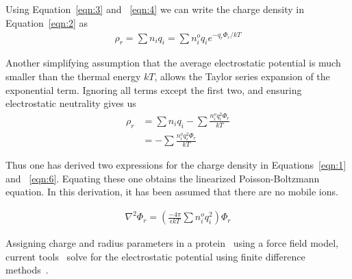 Using Equation~\ref{eqn:3} and ~\ref{eqn:4} we can write the charge density in Equation~\ref{eqn:2} as
\begin{align}
\label{eqn:5}      \rho_{r} = \sum n_{i}q_{i} = \sum n_{i}^{o}q_{i}e^{-q_{r}\Phi_{r}/kT} 
\end{align}


Another simplifying assumption that the average electrostatic potential is much smaller than the thermal energy $kT$,
allows the Taylor series expansion of the exponential term. Ignoring all terms except the first two, and ensuring 
electrostatic neutrality gives us
\begin{align}
\nonumber      \rho_{r}  & =  \sum n_{i}q_{i} -  \sum \frac{n_{i}^{o}q_{i}^{2}\Phi_{r}}{kT} \\
\label{eqn:6}      & =   -  \sum \frac{n_{i}^{o}q_{i}^{2}\Phi_{r}}{kT}
\end{align}



Thus one has derived two expressions for the charge density in Equations~\ref{eqn:1} and ~\ref{eqn:6}. 
Equating these one obtains the linearized Poisson-Boltzmann equation. In this derivation, it has been assumed that there are no mobile ions.

\begin{align}
\label{eqn:7}      \nabla^{2}\Phi_{r} = \left( \frac{-4\pi}{ \epsilon kT  }  \sum n_{i}^{o}q_{i}^{2} \right)\Phi_{r}  
\end{align}

Assigning charge and radius parameters in a protein~\citep{PDB2PQR} using a force field model, current tools~\citep{DELPHI,APBS} solve for the electrostatic potential using finite difference methods~\citep{FINITEDIFF}. 

